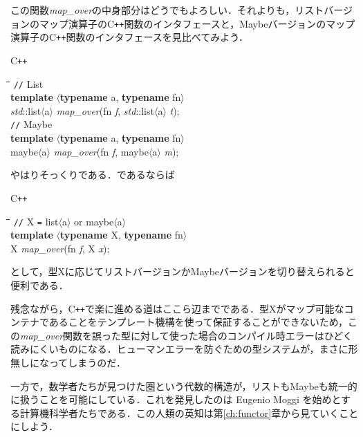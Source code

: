 \documentclass[twocolumn]{jsbook}
\newcommand{\cxx}{\textrm{C}\texttt{++}}
\newenvironment{cxxcode}{\begin{itembox}[r]{\cxx}}{\end{itembox}}
\newenvironment{python}{\begin{tabbing}\hspace*{1em}\=\hspace*{1em}\=\hspace*{1em}\=\hspace*{1em}\=\kill}{\end{tabbing}}
\newcommand{\pthnClassname}[1]{\textrm{#1}}
\newcommand{\pthnId}[1]{\textit{#1}}
\newcommand{\pthnKeyword}[1]{\textbf{#1}}
\newcommand{\pthnOp}[1]{\texttt{#1}}
\begin{document}
この関数\pthnId{map\_over}の中身部分はどうでもよろしい．それよりも，リストバージョンのマップ演算子の\cxx 関数のインタフェースと，Maybeバージョンのマップ演算子の\cxx 関数のインタフェースを見比べてみよう．
\begin{cxxcode}
\begin{python}
\verb|//| List\\
\pthnKeyword{template} $\langle$\pthnKeyword{typename} \pthnClassname{a}, \pthnKeyword{typename} \pthnClassname{fn}$\rangle$\\
\pthnId{std}::\pthnClassname{list}$\langle$\pthnClassname{a}$\rangle$ \pthnId{map\_over}(\pthnClassname{fn} \pthnId{f}, \pthnId{std}::\pthnClassname{list}$\langle$\pthnClassname{a}$\rangle$ \pthnId{t});\\
\verb|//| Maybe\\
\pthnKeyword{template} $\langle$\pthnKeyword{typename} \pthnClassname{a}, \pthnKeyword{typename} \pthnClassname{fn}$\rangle$\\
\pthnClassname{maybe}$\langle$\pthnClassname{a}$\rangle$ \pthnId{map\_over}(\pthnClassname{fn} \pthnId{f}, \pthnClassname{maybe}$\langle$\pthnClassname{a}$\rangle$ \pthnId{m});
\end{python}
\end{cxxcode}
やはりそっくりである．であるならば
\begin{cxxcode}
\begin{python}
\verb|//| \pthnClassname{X} \pthnOp{=} \pthnClassname{list}$\langle$\pthnClassname{a}$\rangle$ or \pthnClassname{maybe}$\langle$\pthnClassname{a}$\rangle$ \\
\pthnKeyword{template} $\langle$\pthnKeyword{typename} \pthnClassname{X}, \pthnKeyword{typename} \pthnClassname{fn}$\rangle$\\
\pthnClassname{X} \pthnId{map\_over}(\pthnClassname{fn} \pthnId{f}, \pthnClassname{X} \pthnId{x});
\end{python}
\end{cxxcode}
として，型\pthnClassname{X}に応じてリストバージョンかMaybeバージョンを切り替えられると便利である．

残念ながら，\cxx で楽に進める道はここら辺までである．型\pthnClassname{X}がマップ可能なコンテナであることをテンプレート機構を使って保証することができないため，この\pthnId{map\_over}関数を誤った型に対して使った場合のコンパイル時エラーはひどく読みにくいものになる．ヒューマンエラーを防ぐための型システムが，まさに形無しになってしまうのだ．

一方で，数学者たちが見つけた圏という代数的構造が，リストもMaybeも統一的に扱うことを可能にしている．これを発見したのは Eugenio Moggi を始めとする計算機科学者たちである．この人類の英知は第\ref{ch:functor}章から見ていくことにしよう．
\end{document}
